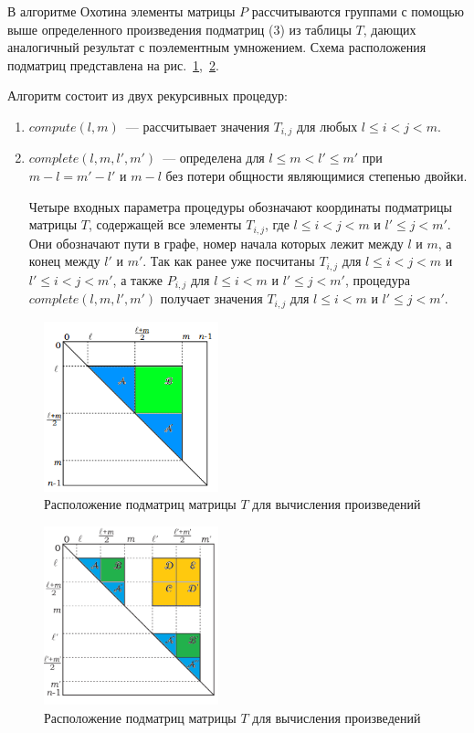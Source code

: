 В алгоритме Охотина элементы матрицы $P$ рассчитываются
группами с помощью выше определенного произведения
подматриц (3) из таблицы $T$, дающих аналогичный результат с
поэлементным умножением. Схема расположения подматриц
представлена на рис.~\ref{submatrices1},~\ref{submatrices2}.

Алгоритм состоит из двух рекурсивных процедур:
\begin{enumerate}
\item $compute(l, m)$~--- рассчитывает значения $T_{i,j}$ для любых $l \le i < j < m$.
\item $complete(l, m, l', m')$~--- определена для $l \le m < l' \le m'$ при $m - l = m' - l'$ и $m - l$ без потери общности являющимися степенью двойки.

Четыре входных параметра процедуры обозначают координаты
подматрицы матрицы $T$, содержащей все элементы $T_{i,j}$, где $l \le i < j < m$ и $l' \le j < m'$. Они обозначают пути в графе, номер начала которых лежит между $l$ и $m$, а конец между $l'$ и $m'$. Так как ранее уже посчитаны $T_{i,j}$ для $l \le i < j < m$ и $l' \le i < j < m'$, а также $P_{i,j}$ для $l \le i < m$ и $l' \le j < m'$, процедура $complete(l, m, l', m')$ получает значения $T_{i,j}$ для $l \le i < m$ и $l' \le j < m'$.
\end{enumerate}
\begin{figure}
\centering
\includegraphics[width=0.45\textwidth]{Shemetova/subm1.png}
\caption{Расположение подматриц матрицы $T$ для вычисления произведений}
\label{submatrices1}
\end{figure}
\begin{figure}
\centering
\includegraphics[width=0.45\textwidth]{Shemetova/sub1.jpg}
\caption{Расположение подматриц матрицы $T$ для вычисления произведений}
\label{submatrices2}
\end{figure}

